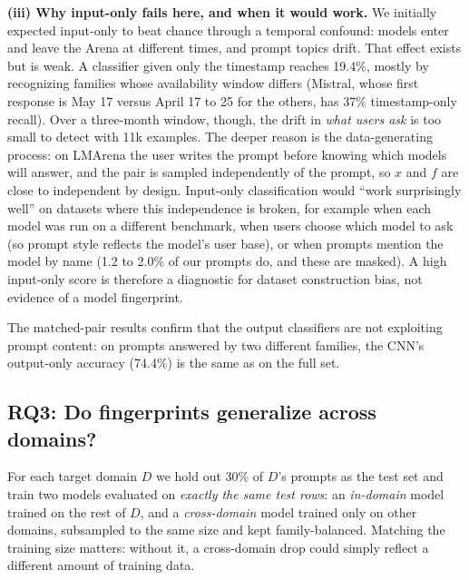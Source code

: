 \documentclass[11pt]{article}
\newcommand{\pct}[1]{#1\%}
\begin{document}
\textbf{(iii) Why input-only fails here, and when it would work.} We initially expected input-only to beat chance through a temporal confound: models enter and leave the Arena at different times, and prompt topics drift. That effect exists but is weak. A classifier given only the timestamp reaches \pct{19.4}, mostly by recognizing families whose availability window differs (Mistral, whose first response is May 17 versus April 17 to 25 for the others, has \pct{37} timestamp-only recall). Over a three-month window, though, the drift in \emph{what users ask} is too small to detect with 11k examples. The deeper reason is the data-generating process: on LMArena the user writes the prompt before knowing which models will answer, and the pair is sampled independently of the prompt, so $x$ and $f$ are close to independent by design. Input-only classification would ``work surprisingly well'' on datasets where this independence is broken, for example when each model was run on a different benchmark, when users choose which model to ask (so prompt style reflects the model's user base), or when prompts mention the model by name (1.2 to \pct{2.0} of our prompts do, and these are masked). A high input-only score is therefore a diagnostic for dataset construction bias, not evidence of a model fingerprint.

The matched-pair results confirm that the output classifiers are not exploiting prompt content: on prompts answered by two different families, the CNN's output-only accuracy (\pct{74.4}) is the same as on the full set.

\subsection{RQ3: Do fingerprints generalize across domains?}
For each target domain $D$ we hold out \pct{30} of $D$'s prompts as the test set and train two models evaluated on \emph{exactly the same test rows}: an \emph{in-domain} model trained on the rest of $D$, and a \emph{cross-domain} model trained only on other domains, subsampled to the same size and kept family-balanced. Matching the training size matters: without it, a cross-domain drop could simply reflect a different amount of training data.
\end{document}
